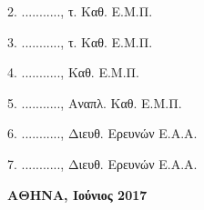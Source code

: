 \begin{titlein}
\begin{minipage}[t]{0.47\textwidth}
{      2. ..........., τ. Καθ. Ε.Μ.Π.
      
      3. ..........., τ. Καθ. Ε.Μ.Π.
    
      4. ..........., Καθ. Ε.Μ.Π.
      
      5. ..........., Αναπλ. Καθ. Ε.Μ.Π.
      
      6. ..........., Διευθ. Ερευνών Ε.Α.Α.
      
      7. ..........., Διευθ. Ερευνών Ε.Α.Α.
      }
    \end{minipage}



\vfill
    \centering \large \textbf{ΑΘΗΝΑ, Ιούνιος 2017}
\end{titlein}
